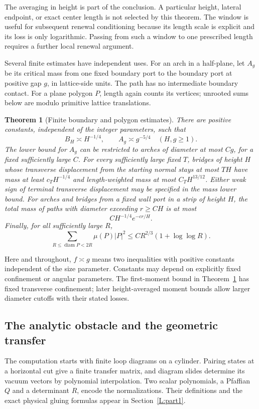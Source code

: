 \documentclass[11pt]{article}
\numberwithin{equation}{section}
\newtheorem{theorem}{Theorem}[section]
\theoremstyle{definition}\newtheorem{definition}[theorem]{Definition}
\theoremstyle{remark}\newtheorem{remark}[theorem]{Remark}
\begin{document}
The averaging in height is part of the conclusion. A particular height,
lateral endpoint, or exact center length is not selected by this theorem.
The window is useful for subsequent renewal conditioning because its length
scale is explicit and its loss is only logarithmic. Passing from such a
window to one prescribed length requires a further local renewal argument.

Several finite estimates have independent uses. For an arch in a half-plane,
let $A_g$ be its critical mass from one fixed boundary port to the boundary
port at positive gap $g$, in lattice-side units. The path has no intermediate
boundary contact. For a plane polygon $P$, length again counts its vertices;
unrooted sums below are modulo primitive lattice translations.

\begin{theorem}[Finite boundary and polygon estimates]\label{L:thm:finite}
There are positive constants, independent of the integer parameters, such
that
\[
 B_H\asymp H^{-1/4},\qquad A_g\asymp g^{-5/4}\quad(H,g\ge1).
\]
The lower bound for $A_g$ can be restricted to arches of diameter at most
$C g$, for a fixed sufficiently large $C$.
For every sufficiently large fixed $T$, bridges of height $H$ whose
transverse displacement from the starting normal stays at most $TH$
have mass at least $c_T H^{-1/4}$ and length-weighted mass at most
$C_T H^{13/12}$. Either weak sign of terminal transverse displacement
may be specified in the mass lower bound.
For arches and bridges from a fixed wall port in a strip of height $H$,
the total mass of paths with diameter exceeding $r\ge C H$ is at most
\[
 C H^{-1/4}e^{-c r/H}.
\]
Finally, for all sufficiently large $R$,
\[
 \sum_{R\le\operatorname{diam} P<2R}\mu(P)|P|^2
 \le C R^{2/3}(1+\log\log R).
\]
\end{theorem}

Here and throughout, $f\asymp g$ means two inequalities with positive
constants independent of the size parameter. Constants may depend on
explicitly fixed confinement or angular parameters. The first-moment
bound in Theorem~\ref{L:thm:finite} has fixed transverse confinement; later
height-averaged moment bounds allow larger diameter cutoffs with their
stated losses.

\subsection{The analytic obstacle and the geometric transfer}
The computation starts with finite loop diagrams on a cylinder. Pairing
states at a horizontal cut give a finite transfer matrix, and diagram
slides determine its vacuum vectors by polynomial interpolation. Two
scalar polynomials, a Pfaffian $Q$ and a determinant $R$, encode the
normalizations. Their definitions and the exact physical gluing formulas
appear in Section~\ref{L:part1}.
\end{document}

